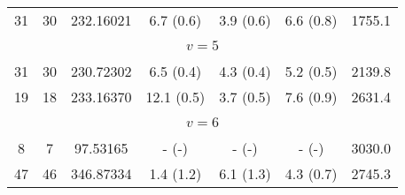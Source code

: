 \begin{table*}[htp]
\begin{tabular}{ccccccc}
 31 & 30 & 232.16021 & 6.7 (0.6) & 3.9 (0.6) & 6.6 (0.8) & 1755.1 \\
&\vspace{-0.75em}\\
\multicolumn{7}{c}{$v = 5$} \\
\vspace{-0.75em}\\
 31 & 30 & 230.72302 & 6.5 (0.4) & 4.3 (0.4) & 5.2 (0.5) & 2139.8 \\
 19 & 18 & 233.16370 & 12.1 (0.5) & 3.7 (0.5) & 7.6 (0.9) & 2631.4 \\
&\vspace{-0.75em}\\
\multicolumn{7}{c}{$v = 6$} \\
\vspace{-0.75em}\\
 8 & 7 & 97.53165 & - (-) & - (-) & - (-) & 3030.0 \\
 47 & 46 & 346.87334 & 1.4 (1.2) & 6.1 (1.3) & 4.3 (0.7) & 2745.3 \\
\hline
\end{tabular}

\par 
\end{table*}
